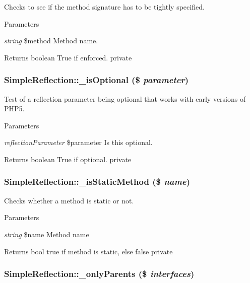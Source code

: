\label{class_simple_reflection_abd74b1744a218f103d5d96ad95ce6f13}
Checks to see if the method signature has to be tightly specified. 
\begin{DoxyParams}{Parameters}
\item[{\em string}]\$method Method name. \end{DoxyParams}
\begin{DoxyReturn}{Returns}
boolean True if enforced.  private 
\end{DoxyReturn}
\hypertarget{class_simple_reflection_a819a499d68a179ddb1edcc0ecbfec02e}{
\subsubsection[{\_\-isOptional}]{\setlength{\rightskip}{0pt plus 5cm}SimpleReflection::\_\-isOptional (\$ {\em parameter})}}
\label{class_simple_reflection_a819a499d68a179ddb1edcc0ecbfec02e}
Test of a reflection parameter being optional that works with early versions of PHP5. 
\begin{DoxyParams}{Parameters}
\item[{\em reflectionParameter}]\$parameter Is this optional. \end{DoxyParams}
\begin{DoxyReturn}{Returns}
boolean True if optional.  private 
\end{DoxyReturn}
\hypertarget{class_simple_reflection_a87c6f5b63b2eecc642580e32660417ae}{
\subsubsection[{\_\-isStaticMethod}]{\setlength{\rightskip}{0pt plus 5cm}SimpleReflection::\_\-isStaticMethod (\$ {\em name})}}
\label{class_simple_reflection_a87c6f5b63b2eecc642580e32660417ae}
Checks whether a method is static or not. 
\begin{DoxyParams}{Parameters}
\item[{\em string}]\$name Method name \end{DoxyParams}
\begin{DoxyReturn}{Returns}
bool true if method is static, else false  private 
\end{DoxyReturn}
\hypertarget{class_simple_reflection_ab619efb054cde5a01c7db7dece7884fa}{
\subsubsection[{\_\-onlyParents}]{\setlength{\rightskip}{0pt plus 5cm}SimpleReflection::\_\-onlyParents (\$ {\em interfaces})}}
